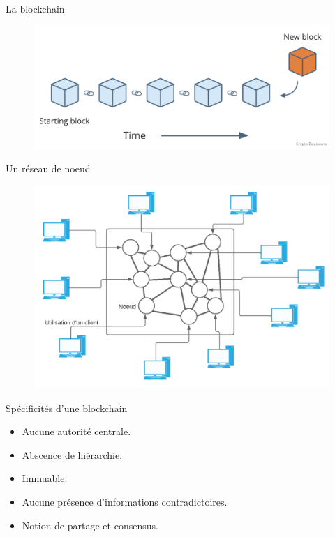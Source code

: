 \begin{frame}{La blockchain}
    \begin{figure}
        \centering
        \includegraphics[scale = 0.2]{introduction/blockchain.png}
    \end{figure}
\end{frame}

\begin{frame}{Un réseau de noeud}
    \begin{figure}
        \centering
        \includegraphics[scale = 0.6]{introduction/ReseauNoeuds.png}
    \end{figure}
\end{frame}

\begin{frame}{Spécificités d'une blockchain}
    \begin{itemize}
        \item Aucune autorité centrale.
        \item Abscence de hiérarchie.
        \item Immuable.
        \item Aucune présence d'informations contradictoires.
        \item Notion de partage et consensus. 
    \end{itemize}
\end{frame}

